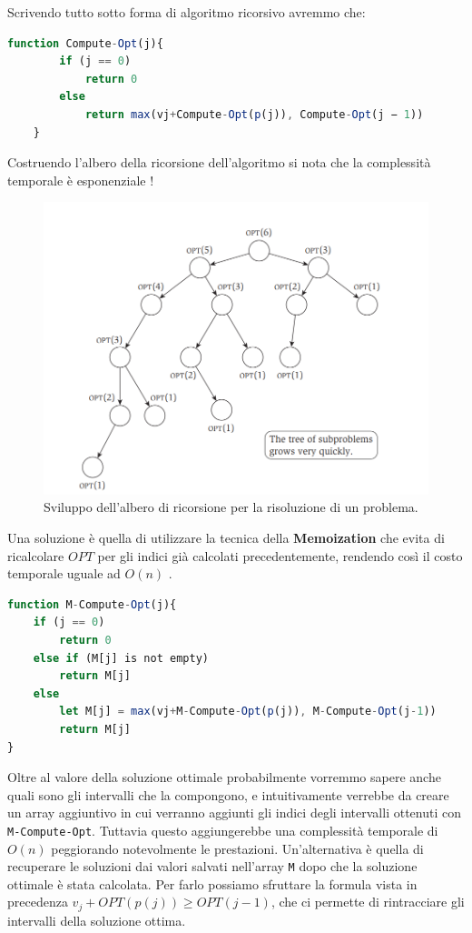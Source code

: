 Scrivendo tutto sotto forma di algoritmo ricorsivo avremmo che:

\begin{lstlisting}[language=Javascript]
    function Compute-Opt(j){
        if (j == 0)
            return 0
        else
            return max(vj+Compute-Opt(p(j)), Compute-Opt(j − 1))
    }
\end{lstlisting}

Costruendo l'albero della ricorsione dell'algoritmo si nota che la complessità
temporale è esponenziale  !

\begin{figure}[H]
    \centering
    \includegraphics[width=12cm, keepaspectratio]{capitoli/dynamic_programming/imgs/opt_albero.png}
    \caption{Sviluppo dell'albero di ricorsione per la risoluzione di un problema.}
\end{figure}

\pagebreak

Una soluzione è quella di utilizzare la tecnica della \textbf{Memoization} che evita
di ricalcolare $OPT$ per gli indici già calcolati precedentemente, rendendo così
il costo temporale uguale ad $O(n)$ .

\begin{lstlisting}[language=Javascript]
function M-Compute-Opt(j){
    if (j == 0)
        return 0
    else if (M[j] is not empty)
        return M[j]
    else
        let M[j] = max(vj+M-Compute-Opt(p(j)), M-Compute-Opt(j-1))
        return M[j]
}
\end{lstlisting}

Oltre al valore della soluzione ottimale probabilmente vorremmo sapere anche
quali sono gli intervalli che la compongono, e intuitivamente verrebbe da creare
un array aggiuntivo in cui verranno aggiunti gli indici degli intervalli
ottenuti con \verb|M-Compute-Opt|. Tuttavia questo aggiungerebbe una complessità
temporale di $O(n)$ peggiorando notevolmente le prestazioni. Un'alternativa è
quella di recuperare le soluzioni dai valori salvati nell'array \verb|M| dopo che la
soluzione ottimale è stata calcolata. Per farlo possiamo sfruttare la formula
vista in precedenza $v_j + OPT(p(j)) \geq OPT(j-1)$, che ci permette di
rintracciare gli intervalli della soluzione ottima.

